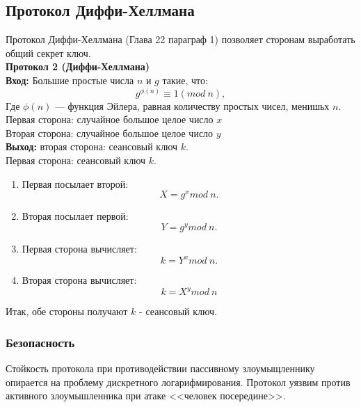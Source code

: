 \subsection{Протокол Диффи-Хеллмана}
Протокол Диффи-Хеллмана \autocite{Shnayer}(Глава 22 параграф 1) позволяет сторонам выработать общий секрет ключ.\\
\textbf{Протокол 2 (Диффи-Хеллмана)}\\
\hspace*{10mm}\textbf{Вход:} Большие простые числа $n$ и $g$ такие, что:
$$g^{\phi(n)}\equiv1(mod\ n),$$
Где $\phi(n)$ --- функция Эйлера, равная количеству простых чисел, менишьх $n$.
Первая сторона: случайное большое целое число $x$\\
Вторая сторона: случайное большое целое число $y$\\
\hspace*{10mm}\textbf{Выход:} вторая сторона: сеансовый ключ $k$.\\
\hspace*{10mm}Первая сторона: сеансовый ключ $k$.
\begin{enumerate}
	\item Первая посылает второй:
	$$X = g^{x}mod\ n.$$
	\item Вторая посылает первой:
	$$Y = g^{y}mod\ n.$$
	\item Первая сторона вычисляет:
	$$k = Y^{x}mod\ n.$$
	\item Вторая сторона вычисляет:
	$$k = X^{y}mod\ n$$
\end{enumerate}
Итак, обе стороны получают $k$ - сеансовый ключ.
\subsubsection{Безопасность}
Стойкость протокола при противодействии пассивному злоумыщленнику опирается на проблему дискретного логарифмирования. Протокол уязвим против активного злоумышленника при атаке <<человек посередине>>.

